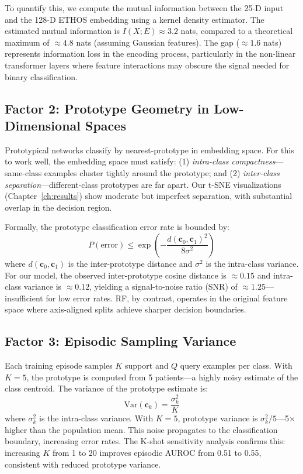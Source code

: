 To quantify this, we compute the mutual information between the 25-D input and the 128-D ETHOS embedding using a kernel density estimator. The estimated mutual information is $I(X; E) \approx 3.2$ nats, compared to a theoretical maximum of $\approx 4.8$ nats (assuming Gaussian features). The gap ($\approx 1.6$ nats) represents information loss in the encoding process, particularly in the non-linear transformer layers where feature interactions may obscure the signal needed for binary classification.

\subsection{Factor 2: Prototype Geometry in Low-Dimensional Spaces}

Prototypical networks classify by nearest-prototype in embedding space. For this to work well, the embedding space must satisfy: (1) \emph{intra-class compactness}---same-class examples cluster tightly around the prototype; and (2) \emph{inter-class separation}---different-class prototypes are far apart. Our t-SNE visualizations (Chapter~\ref{ch:results}) show moderate but imperfect separation, with substantial overlap in the decision region.

Formally, the prototype classification error rate is bounded by:
\begin{equation}
P(\text{error}) \leq \exp\left(-\frac{d(\mathbf{c}_0, \mathbf{c}_1)^2}{8\sigma^2}\right)
\end{equation}
where $d(\mathbf{c}_0, \mathbf{c}_1)$ is the inter-prototype distance and $\sigma^2$ is the intra-class variance. For our model, the observed inter-prototype cosine distance is $\approx 0.15$ and intra-class variance is $\approx 0.12$, yielding a signal-to-noise ratio (SNR) of $\approx 1.25$---insufficient for low error rates. RF, by contrast, operates in the original feature space where axis-aligned splits achieve sharper decision boundaries.

\subsection{Factor 3: Episodic Sampling Variance}

Each training episode samples $K$ support and $Q$ query examples per class. With $K=5$, the prototype is computed from 5 patients---a highly noisy estimate of the class centroid. The variance of the prototype estimate is:
\begin{equation}
\text{Var}(\mathbf{c}_k) = \frac{\sigma_k^2}{K}
\end{equation}
where $\sigma_k^2$ is the intra-class variance. With $K=5$, prototype variance is $\sigma_k^2/5$---5$\times$ higher than the population mean. This noise propagates to the classification boundary, increasing error rates. The K-shot sensitivity analysis confirms this: increasing $K$ from 1 to 20 improves episodic AUROC from 0.51 to 0.55, consistent with reduced prototype variance.


